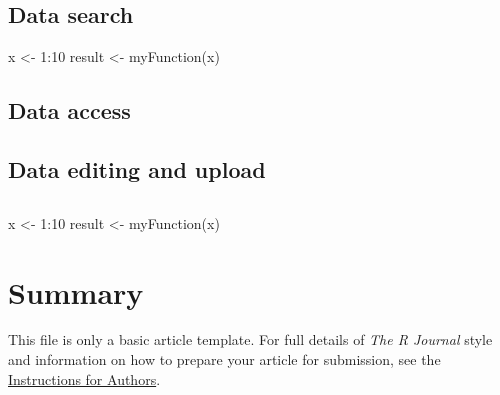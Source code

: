 \subsection{Data search}

\begin{example}
  x <- 1:10
  result <- myFunction(x)
\end{example}


\subsection{Data access}

\subsection{Data editing and upload}


\subsection{}

\begin{example}
  x <- 1:10
  result <- myFunction(x)
\end{example}

\section{Summary}


This file is only a basic article template. For full details of \emph{The R Journal} style and information on how to prepare your article for submission, see the \href{http://journal.r-project.org/share/author-guide.pdf}{Instructions for Authors}.



\address{Luke A Winslow\\
  U.S. Geological Survey Center for Integrated Data Analytics\\
  Middleton, Wisconsin\\
  USA\\}

\address{Scott Chamberlain\\
  Affiliation\\
  Address\\
  Country\\}

\address{Alison Appling\\
  Affiliation\\
  Address\\
  Country\\}

